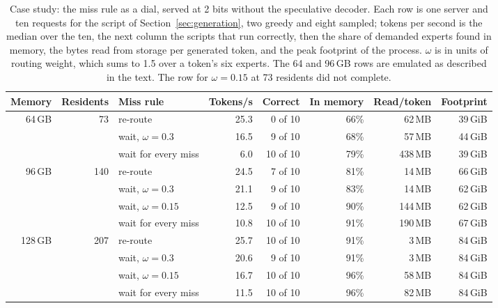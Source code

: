 \documentclass[11pt]{article}
\begin{document}
\begin{table}[ht]
\centering
\small
\begin{tabular}{@{}rrlrrrrr@{}}
\toprule
Memory & Residents & Miss rule & Tokens/s & Correct & In memory & Read/token & Footprint \\
\midrule
 64\,GB &  73 & re-route             & 25.3 &  0 of 10 & 66\% &  62\,MB & 39\,GiB \\
        &     & wait, $\omega=0.3$   & 16.5 &  9 of 10 & 68\% &  57\,MB & 44\,GiB \\
        &     & wait for every miss  &  6.0 & 10 of 10 & 79\% & 438\,MB & 39\,GiB \\
\midrule
 96\,GB & 140 & re-route             & 24.5 &  7 of 10 & 81\% &  14\,MB & 66\,GiB \\
        &     & wait, $\omega=0.3$   & 21.1 &  9 of 10 & 83\% &  14\,MB & 62\,GiB \\
        &     & wait, $\omega=0.15$  & 12.5 &  9 of 10 & 90\% & 144\,MB & 62\,GiB \\
        &     & wait for every miss  & 10.8 & 10 of 10 & 91\% & 190\,MB & 67\,GiB \\
\midrule
128\,GB & 207 & re-route             & 25.7 & 10 of 10 & 91\% &   3\,MB & 84\,GiB \\
        &     & wait, $\omega=0.3$   & 20.6 &  9 of 10 & 91\% &   3\,MB & 84\,GiB \\
        &     & wait, $\omega=0.15$  & 16.7 & 10 of 10 & 96\% &  58\,MB & 84\,GiB \\
        &     & wait for every miss  & 11.5 & 10 of 10 & 96\% &  82\,MB & 84\,GiB \\
\bottomrule
\end{tabular}
\caption{Case study: the miss rule as a dial, served at 2 bits without the speculative decoder.
Each row is one server and ten requests for the script of Section~\ref{sec:generation}, two greedy
and eight sampled; tokens per second is the median over the ten, the next column the scripts that
run correctly, then the share of demanded experts found in memory, the bytes read from storage per
generated token, and the peak footprint of the process. $\omega$ is in units of routing weight,
which sums to 1.5 over a token's six experts. The 64 and 96\,GB rows are emulated as described in
the text. The row for $\omega=0.15$ at 73 residents did not complete.}
\label{tab:dial}
\end{table}
\end{document}
